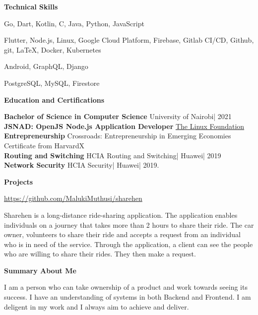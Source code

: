 \documentclass[a4paper]{article}
\begin{document}
\begin{center}
    {\Large \textbf{Technical Skills}}
\end{center}

\begin{description}[noitemsep]
    \item[Languages:] Go, Dart, Kotlin, C, Java, Python, JavaScript
    \item[Platforms and tools:] Flutter, Node.js, Linux, Google Cloud Platform, Firebase, Gitlab CI/CD, Github, git, \LaTeX, Docker, Kubernetes
    \item[Frameworks:] Android, GraphQL, Django
    \item[Databases:] PostgreSQL, MySQL, Firestore
\end{description}

\begin{center}
    {\Large \textbf{Education and Certifications}}
\end{center}

\textbf{Bachelor of Science in Computer Science} University of Nairobi| 2021 \\
\textbf{JSNAD: OpenJS Node.js Application Developer} \href{https://www.credly.com/badges/ab918a14-4dfd-4800-be45-a6a3a8fbd96c/linked_in}{The Linux Foundation} \\
\textbf{Entrepreneurship} Crossroads: Entrepreneurship in Emerging Economies Certificate from HarvardX \\
\textbf{Routing and Switching} HCIA Routing and Switching| Huawei| 2019 \\
\textbf{Network Security} HCIA Security| Huawei| 2019. \par

\begin{center}
    {\Large \textbf{Projects}}
\end{center}

\centering \href{https://github.com/MalukiMuthusi/sharehen}{https://github.com/MalukiMuthusi/sharehen}

Sharehen is a long-distance ride-sharing application. The application enables individuals on a journey that takes more than 2 hours to share their ride. The car owner, volunteers to share their ride and accepts a request from an individual who is in need of the service. Through the application, a client can see the people who are willing to share their rides. They then make a request.


\begin{center}
    {\Large \textbf{Summary About Me}}
\end{center}

I am a person who can take ownership of a product and work towards seeing its success. I have an understanding of systems in both Backend and Frontend. I am deligent in my work and I always aim to achieve and deliver.

\end{document}

